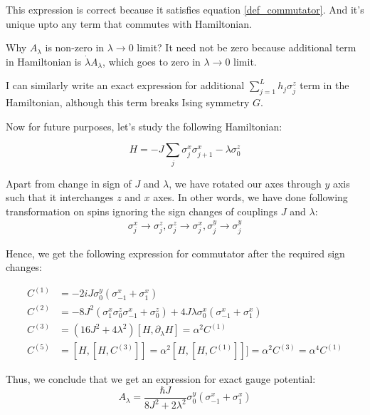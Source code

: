 \documentclass[11pt,a4paper]{article}
\begin{document}
This expression is correct because it satisfies equation \ref{def_commutator}. And it's unique upto any term that commutes with Hamiltonian.



Why $A_{\lambda}$ is non-zero in $\lambda \rightarrow 0$ limit? It need not be zero because additional term in Hamiltonian is $\dot{\lambda} A_{\lambda}$, which goes to zero in $\lambda \rightarrow 0$ limit. 

I can similarly write an exact expression for additional $\sum_{j=1}^L h_j \sigma_j^z$ term in the Hamiltonian, although this term breaks Ising symmetry $G$.


Now for future purposes, let's study the following Hamiltonian:

\begin{equation}
H= -J \sum_{j}  \sigma_j^x \sigma_{j+1}^x -  \lambda  \sigma_0^z
\label{xx}
\end{equation}

Apart from change in sign of $J$ and $\lambda$, we have rotated our axes through $y$ axis such that it interchanges $z$ and $x$ axes. In other words, we have done following transformation on spins ignoring the sign changes of couplings $J$ and $\lambda$:
\begin{align*}
\sigma_j^x \rightarrow \sigma_j^z, \sigma_j^z \rightarrow  \sigma_j^x, \sigma_j^y \rightarrow \sigma_j^y
\end{align*}

Hence, we get the following  expression for commutator after the required sign changes:


\begin{align*}
C^{(1)}&= -2 i J \sigma_0^y ( \sigma_{-1}^x + \sigma_1^x) \\ 
C^{(2)}&= - 8 J^2(\sigma^x_1 \sigma^z_0 \sigma^x_{-1} + \sigma^z_0) + 4J \lambda \sigma_0^x( \sigma_{-1}^x + \sigma_1^x) \\
C^{(3)} &=  (16 J^2 + 4 \lambda ^2) [H, \partial_{\lambda} H] = \alpha^2  C^{(1)} \\
C^{(5)}&=[H,[H, C^{(3)}]]  = \alpha^2 [H, [H,C^{(1)}]]]=\alpha^2 C^{(3)}=  \alpha^4 C^{(1)}   
\end{align*}

Thus, we conclude that we get an expression for exact gauge potential:
\begin{equation}
\boxed{ A_{\lambda} = \dfrac{\hbar J}{{8 J^2 + 2 \lambda ^2 }} \sigma_0^y ( \sigma_{-1}^x + \sigma_1^x)}
\end{equation}
\end{document}
